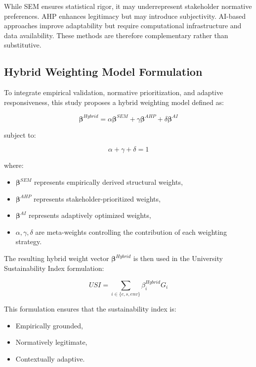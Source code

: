 \documentclass[11pt,a4paper]{article}
\begin{document}
While SEM ensures statistical rigor, it may underrepresent stakeholder normative preferences. AHP enhances legitimacy but may introduce subjectivity. AI-based approaches improve adaptability but require computational infrastructure and data availability. These methods are therefore complementary rather than substitutive.

\subsection{Hybrid Weighting Model Formulation}

To integrate empirical validation, normative prioritization, and adaptive responsiveness, this study proposes a hybrid weighting model defined as:

\begin{equation}
\boldsymbol{\beta}^{Hybrid} =
\alpha \boldsymbol{\beta}^{SEM}
+ \gamma \boldsymbol{\beta}^{AHP}
+ \delta \boldsymbol{\beta}^{AI}
\end{equation}

subject to:

\begin{equation}
\alpha + \gamma + \delta = 1
\end{equation}

where:
\begin{itemize}
\item $\boldsymbol{\beta}^{SEM}$ represents empirically derived structural weights,
\item $\boldsymbol{\beta}^{AHP}$ represents stakeholder-prioritized weights,
\item $\boldsymbol{\beta}^{AI}$ represents adaptively optimized weights,
\item $\alpha, \gamma, \delta$ are meta-weights controlling the contribution of each weighting strategy.
\end{itemize}

The resulting hybrid weight vector $\boldsymbol{\beta}^{Hybrid}$ is then used in the University Sustainability Index formulation:

\begin{equation}
USI = \sum_{i \in \{e,s,env\}} \beta_i^{Hybrid} G_i
\end{equation}

This formulation ensures that the sustainability index is:

\begin{itemize}
\item Empirically grounded,
\item Normatively legitimate,
\item Contextually adaptive.
\end{itemize}
\end{document}
